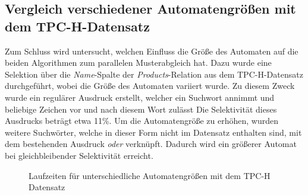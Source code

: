 \subsection{Vergleich verschiedener Automatengrößen mit dem TPC-H-Datensatz}
\label{sec:regex_evaluation_beobachtung_5}

Zum Schluss wird untersucht, welchen Einfluss die Größe des Automaten auf die beiden Algorithmen zum parallelen Musterabgleich hat.
Dazu wurde eine Selektion über die \emph{Name}-Spalte der \emph{Products}-Relation aus dem TPC-H-Datensatz durchgeführt, wobei die Größe des Automaten variiert wurde.
Zu diesem Zweck wurde ein regulärer Ausdruck erstellt, welcher ein Suchwort annimmt und beliebige Zeichen vor und nach diesem Wort zulässt
Die Selektivität dieses Ausdrucks beträgt etwa 11\%.
Um die Automatengröße zu erhöhen, wurden weitere Suchwörter, welche in dieser Form nicht im Datensatz enthalten sind, mit dem bestehenden Ausdruck \emph{oder} verknüpft.
Dadurch wird ein größerer Automat bei gleichbleibender Selektivität erreicht.


\begin{figure}[]
	\centering
	\caption{Laufzeiten für unterschiedliche Automatengrößen mit dem TPC-H Datensatz}
	\label{fig:regex_p_name}
\end{figure}

